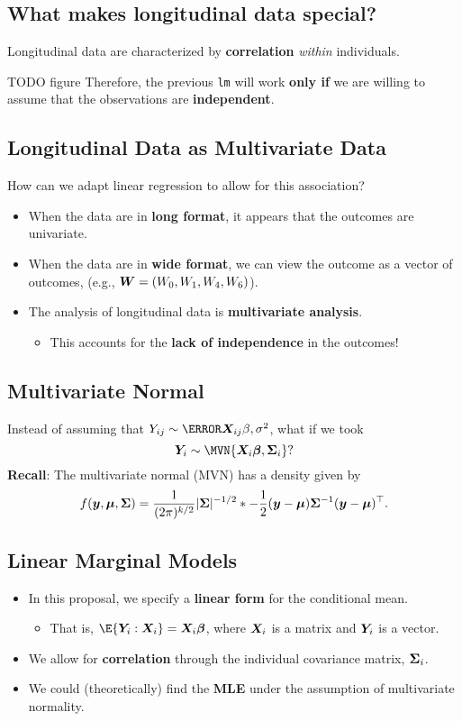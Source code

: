 \subsection*{What makes longitudinal data special?}
Longitudinal data are characterized by \textbf{correlation} \emph{within} individuals.

TODO figure
Therefore, the previous \texttt{lm} will work \textbf{only if} we are willing
to assume that the observations are
\textbf{independent}.
\subsection*{Longitudinal Data as Multivariate Data}
How can we adapt linear regression to allow for this
association?
\begin{itemize}
    \item When the data are in \textbf{long format}, it appears that the outcomes are univariate.
    \item When the data are in \textbf{wide format}, we can view the outcome as a vector of
          outcomes, (e.g., $ \bm{W}=(W_0,W_1,W_4,W_6) $).
    \item The analysis of longitudinal data is \textbf{multivariate analysis}.
          \begin{itemize}
              \item This accounts for the \textbf{lack of independence} in the outcomes!
          \end{itemize}
\end{itemize}
\subsection*{Multivariate Normal}
Instead of assuming that $ Y_{ij}\sim \N{\Matrix{X}_{ij}\beta,\sigma^2} $,
what if we took
\[ \Matrix{Y}_i \sim \MVN{\Matrix{X}_i\Matrix{\beta},\Matrix{\Sigma}_i}? \]
\textbf{Recall}: The multivariate normal (MVN) has a density given by
\[ f(\bm{y},\bm{\mu},\bm{\Sigma})=
    \frac{1}{(2\pi)^{k/2}}\lvert\bm{\Sigma}\rvert^{-1/2}
    \relax*{-\frac{1}{2}(\bm{y}-\bm{\mu})\bm{\Sigma}^{-1}(\bm{y}-\bm{\mu})^\top}.
\]
\subsection*{Linear Marginal Models}
\begin{itemize}
    \item In this proposal, we specify a \textbf{linear form} for the conditional mean.
          \begin{itemize}
              \item That is, $ \E{\Matrix{Y}_i\given \Matrix{X}_i}=\Matrix{X}_i \Matrix{\beta} $,
                    where $ \bm{X}_i $ is a matrix and $ \bm{Y}_i $ is a vector.
          \end{itemize}
    \item We allow for \textbf{correlation} through the individual covariance
          matrix, $ \bm{\Sigma}_i $.
    \item We could (theoretically) find the \textbf{MLE} under the assumption of
          multivariate normality.
\end{itemize}
